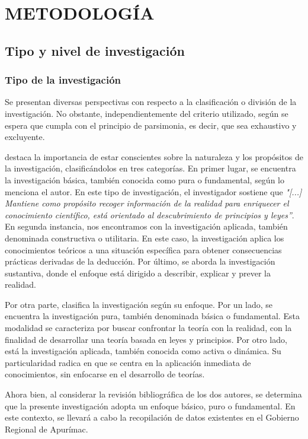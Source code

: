 \chapter{METODOLOGÍA}
\section{Tipo y nivel de investigación}
\subsection{Tipo de la investigación}

Se presentan diversas perspectivas con respecto a la clasificación o división de la investigación. No obstante, independientemente del criterio utilizado, según \cite[]{Zacarias2020} se espera que cumpla con el principio de parsimonia, es decir, que sea exhaustivo y excluyente.

\cite[47]{SanchezCarlessi2015} destaca la importancia de estar conscientes sobre la naturaleza y los propósitos de la investigación, clasificándolos en tres categorías. En primer lugar, se encuentra la investigación básica, también conocida como pura o fundamental, según lo menciona el autor. En este tipo de investigación, el investigador sostiene que \emph{"[...] Mantiene como propósito recoger información de la realidad para enriquecer el conocimiento científico, está orientado al descubrimiento de principios y leyes”}. En segunda instancia, nos encontramos con la investigación aplicada, también denominada constructiva o utilitaria. En este caso, la investigación aplica los conocimientos teóricos a una situación específica para obtener consecuencias prácticas derivadas de la deducción. Por último, se aborda la investigación sustantiva, donde el enfoque está dirigido a describir, explicar y prever la realidad.

Por otra parte, \cite[36]{Tamayo2004} clasifica la investigación según su enfoque. Por un lado, se encuentra la investigación pura, también denominada básica o fundamental. Esta modalidad se caracteriza por buscar confrontar la teoría con la realidad, con la finalidad de desarrollar una teoría basada en leyes y principios. Por otro lado, está la investigación aplicada, también conocida como activa o dinámica. Su particularidad radica en que se centra en la aplicación inmediata de conocimientos, sin enfocarse en el desarrollo de teorías.

Ahora bien, al considerar la revisión bibliográfica de los dos autores, se determina que la presente investigación adopta un enfoque básico, puro o fundamental. En este contexto, se llevará a cabo la recopilación de datos existentes en el Gobierno Regional de Apurímac.

